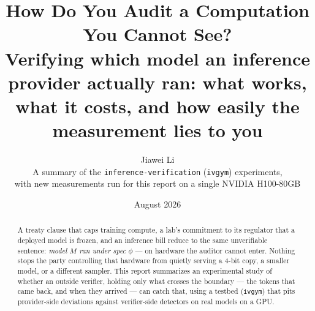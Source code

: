 \documentclass[11pt]{article}
\title{\bfseries How Do You Audit a Computation You Cannot See?\\[2mm]
\large Verifying which model an inference provider actually ran: what works,
what it costs, and how easily the measurement lies to you}
\author{Jiawei Li\\[1mm]
\normalsize A summary of the \texttt{inference-verification} (\texttt{ivgym}) experiments,\\
\normalsize with new measurements run for this report on a single NVIDIA H100-80GB}
\date{August 2026}
\begin{document}
\maketitle

\begin{abstract}
\noindent
A treaty clause that caps training compute, a lab's commitment to its regulator
that a deployed model is frozen, and an inference bill reduce to the same
unverifiable sentence: \emph{model $M$ ran under spec $\phi$} --- on hardware the
auditor cannot enter. Nothing stops the party controlling that hardware from
quietly serving a 4-bit copy, a smaller model, or a different sampler. This report
summarizes an experimental study of whether an outside verifier, holding only what
crosses the boundary --- the tokens that came back, and when they arrived --- can
catch that, using a testbed (\texttt{ivgym}) that pits provider-side deviations
against verifier-side detectors on real models on a GPU.


\end{abstract}
\end{document}
